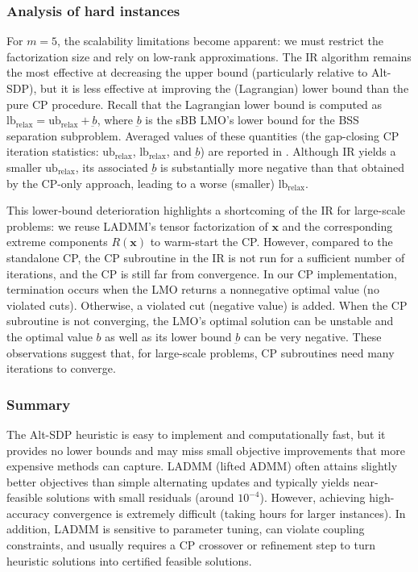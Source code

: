 \documentclass[smallextended]{svjour3}
\newcommand{\1}{\mathbf{1}}
\newcommand{\x}{\mathbf{x}}
\newcommand{\relx}{\text{relax}}
\newcommand{\lb}{\text{lb}}
\newcommand{\ub}{\text{ub}}
\begin{document}
\subsubsection{Analysis of hard instances}

For $m=5$, the scalability limitations become apparent: we must restrict the factorization size and rely on low-rank approximations. The IR algorithm remains the most effective at decreasing the upper bound (particularly relative to Alt-SDP), but it is less effective at improving the (Lagrangian) lower bound than the pure CP procedure. Recall that the Lagrangian lower bound is computed as $\lb_{\relx}=\ub_{\relx}+\underbar{b}$, where $\underbar{b}$ is the sBB LMO's lower bound for the BSS separation subproblem. Averaged values of these quantities (the gap-closing CP iteration statistics: $\ub_{\relx}$, $\lb_{\relx}$, and $\underbar{b}$) are reported in . Although IR yields a smaller $\ub_{\relx}$, its associated $\underbar{b}$ is substantially more negative than that obtained by the CP-only approach, leading to a worse (smaller) $\lb_{\relx}$.


This lower‑bound deterioration  highlights a shortcoming of the IR for large-scale problems: we reuse  LADMM's tensor factorization of $\x$ and the corresponding extreme components $R(\x)$ to warm-start the CP. However,  compared to the standalone CP, the CP subroutine in the IR is not run for a sufficient number of iterations, and the CP is still far from convergence. In our CP implementation, termination occurs when the LMO returns a nonnegative optimal value (no violated cuts). Otherwise, a violated cut (negative value) is added.  When the CP subroutine is not converging, the LMO's optimal solution can be unstable and the optimal value $b$ as well as its lower bound $\underbar{b}$ can be very negative. These observations suggest that, for large-scale problems, CP subroutines need many iterations to converge.

\subsubsection{Summary}

The Alt-SDP heuristic is easy to implement and computationally fast, but it provides no lower bounds and may miss small objective improvements that more expensive methods can capture. LADMM (lifted ADMM) often attains slightly better objectives than simple alternating updates and typically yields near-feasible solutions with small residuals (around $10^{-4}$). However, achieving high-accuracy convergence is extremely difficult (taking hours for larger instances). In addition, LADMM is sensitive to parameter tuning, can violate coupling constraints, and usually requires a CP crossover or refinement step to turn heuristic solutions into certified feasible solutions.
\end{document}
